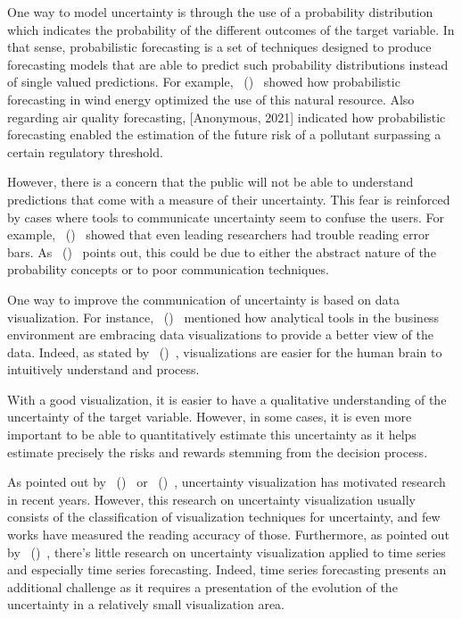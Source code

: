 \documentclass[a4paper,3p,sort&compress]{elsarticle}
\DeclareRobustCommand{\citeextp}[1]{\citeauthor{#1}~(\citeyear{#1})~\cite{#1}}
\begin{document}
One way to model uncertainty is through the use of a probability distribution
which indicates the probability of the different outcomes of the target
variable. In that sense, probabilistic forecasting is a set of techniques
designed to produce forecasting models that are able to predict such probability
distributions instead of single valued predictions. For example, 
\citeextp{pinson_non-parametric_2007} showed how probabilistic forecasting in wind
energy optimized the use of this natural resource. Also regarding air
quality forecasting, [Anonymous, 2021] indicated 
how probabilistic
forecasting enabled the estimation of the future risk of a pollutant surpassing
a certain regulatory threshold.

However, there is a concern that the public will not be able to understand
predictions that come with a measure of their uncertainty. This fear is
reinforced by cases where tools to communicate uncertainty seem to confuse the
users. For example, \citeextp{belia_researchers_2005} showed that even
leading researchers had trouble reading error bars. As 
\citeextp{padilla_uncertainty_2021} points out, this could be due to either the
abstract nature of the probability concepts or to poor communication techniques.

One way to improve the communication of uncertainty is based on data
visualization. For instance, \citeextp{cota_importance_2014}
mentioned how analytical tools in the business environment are embracing data
visualizations to provide a better view of the data. Indeed, as stated by 
\citeextp{islam_overview_2019}, visualizations are easier for the human brain
to intuitively understand and process.

With a good visualization, it is easier to have a qualitative understanding of
the uncertainty of the target variable. However, in some cases, it is even more
important to be able to quantitatively estimate this uncertainty as it helps
estimate precisely the risks and rewards stemming from the decision process.

As pointed out by \citeextp{weiskopf_uncertainty_2022} or 
\citeextp{padilla_uncertainty_2021}, uncertainty visualization has motivated
research in recent years. However, this research on uncertainty visualization
usually consists of the classification of visualization techniques for
uncertainty, and few works have measured the reading accuracy of those.
Furthermore, as pointed out by \citeextp{leffrang_should_2021},
there's little research on uncertainty visualization applied to time series and
especially time series forecasting. Indeed, time series forecasting presents an
additional challenge as it requires a presentation of the evolution of the
uncertainty in a relatively small visualization area.
\end{document}
